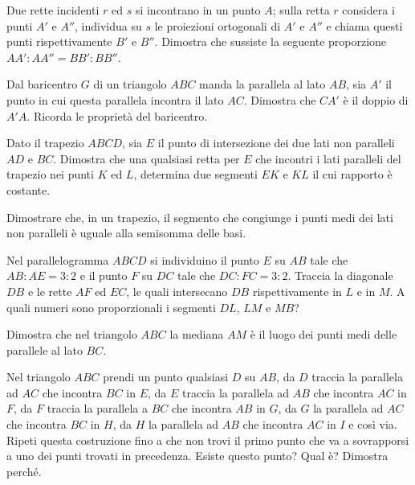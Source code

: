 \begin{multicols}{2}
\begin{esercizio}
\label{ese:6.38}
Due rette incidenti $r$ ed $s$ si incontrano in un punto $A$; sulla retta $r$ considera i punti $A'$ e $A''$, individua su $s$ le proiezioni ortogonali di $A'$ e $A''$ e chiama questi punti rispettivamente $B'$ e $B''$. Dimostra che sussiste la seguente proporzione $AA' : AA'' = BB' : BB''$.
\end{esercizio}

\begin{esercizio}
\label{ese:6.39}
Dal baricentro $G$ di un triangolo $ABC$ manda la parallela al lato $AB$, sia $A'$ il punto in cui questa parallela incontra il lato $AC$. Dimostra che $CA'$ è il doppio di $A'A$. Ricorda le proprietà del baricentro.
\end{esercizio}

\begin{esercizio}
\label{ese:6.40}
Dato il trapezio $ABCD$, sia $E$ il punto di intersezione dei due lati non paralleli $AD$ e $BC$. Dimostra che una qualsiasi retta per $E$ che incontri i lati paralleli del trapezio nei punti $K$ ed $L$, determina due segmenti $EK$ e $KL$ il cui rapporto è costante.
\end{esercizio}

\begin{esercizio}
\label{ese:6.41}
Dimostrare che, in un trapezio, il segmento che congiunge i punti medi dei lati non paralleli è uguale alla semisomma delle basi.
\end{esercizio}

\begin{esercizio}
\label{ese:6.42}
Nel parallelogramma $ABCD$ si individuino il punto $E$ su $AB$ tale che $AB : AE = 3 : 2$ e il punto $F$ su $DC$ tale che $DC : FC = 3 : 2$. Traccia la diagonale $DB$ e le rette $AF$ ed $EC$, le quali intersecano $DB$ rispettivamente in $L$ e in $M$. A quali numeri sono proporzionali i segmenti $DL$, $LM$ e $MB$?
\end{esercizio}

\begin{esercizio}
\label{ese:6.43}
Dimostra che nel triangolo $ABC$ la mediana $AM$ è il luogo dei punti medi delle parallele al lato $BC$.
\end{esercizio}

\begin{esercizio}
\label{ese:6.44}
Nel triangolo $ABC$ prendi un punto qualsiasi $D$ su $AB$, da $D$ traccia la parallela ad $AC$ che incontra $BC$ in $E$, da $E$ traccia la parallela ad $AB$ che incontra $AC$ in $F$, da $F$ traccia la parallela a $BC$ che incontra $AB$ in $G$, da $G$ la parallela ad $AC$ che incontra $BC$ in $H$, da $H$ la parallela ad $AB$ che incontra $AC$ in $I$ e così via. Ripeti questa costruzione fino a che non trovi il primo punto che va a sovrapporsi a uno dei punti trovati in precedenza. Esiste questo punto? Qual è? Dimostra perché.
\end{esercizio}


\end{multicols}
